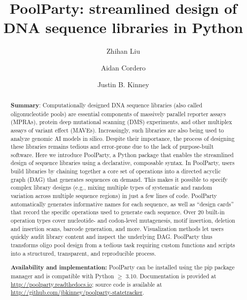 \documentclass[twoside]{kinneylab_preprintstyle}
\begin{document}
\linenumbers
\raggedbottom
{}


\title{PoolParty: streamlined design of DNA sequence libraries in Python}

\author[1]{Zhihan Liu}
\author[1]{Aidan Cordero}
\author[1,\Letter]{Justin B. Kinney}


\begin{abstract}
\textbf{Summary}: Computationally designed DNA sequence libraries (also called oligonucleotide pools) are essential components of massively parallel reporter assays (MPRAs), protein deep mutational scanning (DMS) experiments, and other multiplex assays of variant effect (MAVEs). Increasingly, such libraries are also being used to analyze genomic AI models in silico. Despite their importance, the process of designing these libraries remains tedious and error-prone due to the lack of purpose-built software. Here we introduce PoolParty, a Python package that enables the streamlined design of sequence libraries using a declarative, composable syntax. In PoolParty, users build libraries by chaining together a core set of operations into a directed acyclic graph (DAG) that generates sequences on demand. This makes it possible to specify complex library designs (e.g., mixing multiple types of systematic and random variation across multiple sequence regions) in just a few lines of code. PoolParty automatically generates informative names for each sequence, as well as ``design cards'' that record the specific operations used to generate each sequence. Over 20 built-in operation types cover nucleotide- and codon-level mutagenesis, motif insertion, deletion and insertion scans, barcode generation, and more. Visualization methods let users quickly audit library content and inspect the underlying DAG. PoolParty thus transforms oligo pool design from a tedious task requiring custom functions and scripts into a structured, transparent, and reproducible process. 

\textbf{Availability and implementation:} PoolParty can be installed using the pip package manager and is compatible with Python $\geq$ 3.10. Documentation is provided at \url{http://poolparty.readthedocs.io}; source code is available at \url{http://github.com/jbkinney/poolparty-statetracker}.

\end{abstract}
\end{document}
